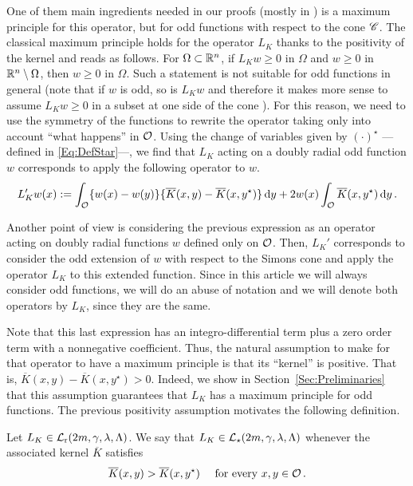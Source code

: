 One of them main ingredients needed in our proofs (mostly in \cite{FelipeSanz-Perela:IntegroDifferentialII}) is a maximum principle for this operator, but for odd functions with respect to the cone $\mathscr{C}$. The classical maximum principle holds for the operator $L_K$ thanks to the positivity of the kernel and reads as follows. For $\Omega \subset \mathbb{R}^n$, if $L_K w \geq 0$ in $\Omega$ and $w \geq 0$ in $\mathbb{R}^n \setminus \Omega$, then $w\geq 0$ in $\Omega$. Such a statement is not suitable for odd functions in general (note that if $w$ is odd, so is $L_K w$ and therefore it makes more sense to assume $L_K w \geq 0$ in a subset  at one side of the cone ). For this reason, we need to use the symmetry of the functions to rewrite the operator taking only into account ``what happens'' in $\mathcal{O}$. Using the change of variables given by $(\cdot)^\star$ ---defined in \eqref{Eq:DefStar}---, we find that $L_K$ acting on a doubly radial odd function $w$ corresponds to apply the following operator to $w$. 
\begin{equation}
	L_K' w (x) := \int_{\mathcal{O}} \{w(x) - w(y) \} \{\overline{K}(x, y) - \overline{K}(x, y^\star)  \} \,\mathrm{d} y +  2 w(x) \int_{\mathcal{O}} \overline{K}(x, y^\star) \,\mathrm{d} y \,.
\end{equation}


Another point of view is considering the previous expression as an operator acting on doubly radial functions $w$ defined only on $\mathcal{O}$. Then, $L_K'$ corresponds to consider the odd extension of  $w$ with respect to the Simons cone and apply the operator $L_K$ to this extended function. Since in this article we will always consider odd functions, we will do an abuse of notation and we will denote both operators by $L_K$, since they are the same.

Note that this last expression has an integro-differential term plus a zero order term with a nonnegative coefficient. Thus, the natural assumption to make for that operator to have a maximum principle is that its ``kernel'' is positive. That is, $\overline{K}(x, y) - \overline{K}(x, y^\star)>0$. Indeed, we show in Section~\ref{Sec:Preliminaries} that this assumption guarantees that $L_K$ has a maximum principle for odd functions. The previous positivity assumption motivates the following definition.

\begin{definition}
	Let $L_K \in \mathcal{L}_{\mathrm{r}}(2m,\gamma,\lambda, \Lambda)$. We say that $L_K\in \mathcal{L}_\star (2m,\gamma,\lambda, \Lambda)$ whenever the associated kernel $\overline{K}$ satisfies
	\begin{equation}
		\label{Eq:KernelInequality}
		\overline{K}(x,y) > \overline{K}(x, y^\star) \quad \text{ for every }x,y \in \mathcal{O}\,.
	\end{equation}
\end{definition}

